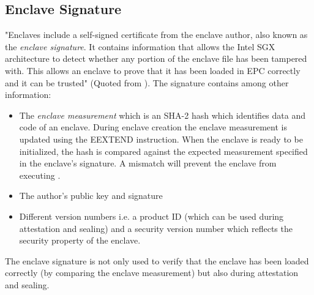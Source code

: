 \subsection{Enclave Signature}
\label{sec:EnclaveSignature}
"Enclaves include a self-signed certificate from the enclave author, also known as the \textit{enclave signature}. It contains information that allows the Intel SGX architecture 
to detect whether any portion of the enclave file has been tampered with. This allows an enclave to prove that it has been loaded in EPC correctly and it can be trusted" (Quoted
from \cite{IntelEnclaveSignature}). The signature contains among other information:
\begin{itemize}
    \item The \textit{enclave measurement} which is an SHA-2 hash \cite{Costan2016IntelSE} which identifies data and code of an enclave. During enclave creation the enclave
          measurement is updated using the EEXTEND instruction. When the enclave is ready to be initialized, the hash is compared against the expected measurement specified
          in the enclave's signature. A mismatch will prevent the enclave from executing \cite{IntelEnclaveSignature}.
    \item The author's public key and signature
    \item Different version numbers i.e. a product ID (which can be used during attestation and sealing) and a security version number which reflects the security property of the
          enclave.
\end{itemize}
The enclave signature is not only used to verify that the enclave has been loaded correctly (by comparing the enclave measurement) but also during attestation and sealing.
